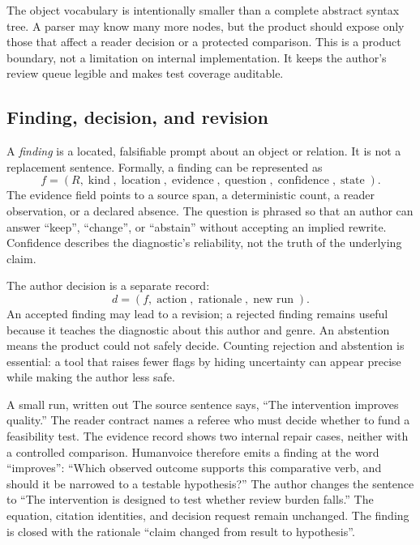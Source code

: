 The object vocabulary is intentionally smaller than a complete abstract
syntax tree. A parser may know many more nodes, but the product should expose
only those that affect a reader decision or a protected comparison. This is a
product boundary, not a limitation on internal implementation. It keeps the
author's review queue legible and makes test coverage auditable.

\subsection{Finding, decision, and revision}

A \emph{finding} is a located, falsifiable prompt about an object or relation.
It is not a replacement sentence. Formally, a finding can be represented as
\[
  f=(R,\operatorname{kind},\operatorname{location},\operatorname{evidence},
     \operatorname{question},\operatorname{confidence},\operatorname{state}).
\]
The evidence field points to a source span, a deterministic count, a reader
observation, or a declared absence. The question is phrased so that an author
can answer ``keep'', ``change'', or ``abstain'' without accepting an implied
rewrite. Confidence describes the diagnostic's reliability, not the truth of
the underlying claim.

The author decision is a separate record:
\[
  d=(f,\operatorname{action},\operatorname{rationale},\operatorname{new\ run}).
\]
An accepted finding may lead to a revision; a rejected finding remains useful
because it teaches the diagnostic about this author and genre. An abstention
means the product could not safely decide. Counting rejection and abstention
is essential: a tool that raises fewer flags by hiding uncertainty can appear
precise while making the author less safe.

\begin{cardexample}{A small run, written out}
The source sentence says, ``The intervention improves quality.'' The reader
contract names a referee who must decide whether to fund a feasibility test.
The evidence record shows two internal repair cases, neither with a controlled
comparison. Humanvoice therefore emits a finding at the word ``improves'':
``Which observed outcome supports this comparative verb, and should it be
narrowed to a testable hypothesis?'' The author changes the sentence to
``The intervention is designed to test whether review burden falls.'' The
equation, citation identities, and decision request remain unchanged. The
finding is closed with the rationale ``claim changed from result to hypothesis''.
\end{cardexample}

